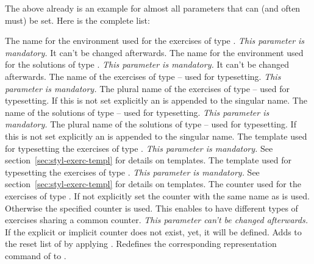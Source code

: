 \documentclass{xsim-manual}
\begin{document}
The above already is an example for almost all parameters that can (and often
must) be set.  Here is the complete list:
\begin{parameters}
    The name for the environment used for the exercises of type .
    \emph{This parameter is mandatory.} It can't be changed afterwards.
    The name for the environment used for the solutions of type .
    \emph{This parameter is mandatory.} It can't be changed afterwards.
    The name of the exercises of type  -- used for typesetting.
    \emph{This parameter is mandatory.}
    The plural name of the exercises of type  --
    used for typesetting.  If this is not set explicitly an  is
    appended to the singular name.
    The name of the solutions of type  -- used for typesetting.
    \emph{This parameter is mandatory.}
    The plural name of the solutions of type  --
    used for typesetting.  If this is not set explicitly an  is
    appended to the singular name.
    The template used for typesetting the exercises of type .
    \emph{This parameter is mandatory.} See
    section~\vref{sec:styl-exerc-templ} for details on templates.
    The template used for typesetting the exercises of type .
    \emph{This parameter is mandatory.} See
    section~\vref{sec:styl-exerc-templ} for details on templates.
    The counter used for the exercises of type .  If not explicitly
    set the counter with the same name as  is used.
    Otherwise the specified counter is used.  This enables to have different
    types of exercises sharing a common counter.  \emph{This parameter can't
      be changed afterwards.}  If the explicit or implicit counter does not
    exist, yet, it will be defined.
    Adds  to the reset list of
     by applying .
    Redefines the corresponding representation command
     of  to .

\end{parameters}
\end{document}
